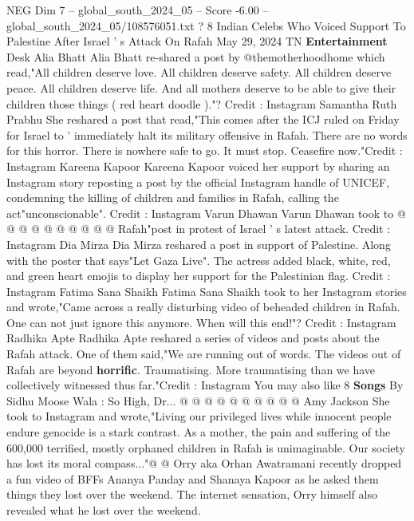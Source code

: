 \begin{textsample}{NEG Dim 7 – global\_south\_2024\_05 – Score -6.00 – global\_south\_2024\_05/108576051.txt}  \label{ex:f7_neg_384}
? 8 Indian Celebs Who Voiced Support To Palestine After Israel ' s Attack On Rafah May 29, 2024 TN \textbf{Entertainment} Desk Alia Bhatt Alia Bhatt re-shared a post by @themotherhoodhome which read,"All children deserve love.
All children deserve safety.
All children deserve peace.
All children deserve life.
And all mothers deserve to be able to give their children those things ( red heart doodle )."?
Credit : Instagram Samantha Ruth Prabhu She reshared a post that read,"This comes after the ICJ ruled on Friday for Israel to ' immediately halt its military offensive in Rafah.
There are no words for this horror.
There is nowhere safe to go.
It must stop.
Ceasefire now."Credit : Instagram Kareena Kapoor Kareena Kapoor voiced her support by sharing an Instagram story reposting a post by the official Instagram handle of UNICEF, condemning the killing of children and families in Rafah, calling the act"unconscionable".
Credit : Instagram Varun Dhawan Varun Dhawan took to @ @ @ @ @ @ @ @ @ @ Rafah"post in protest of Israel ' s latest attack.
Credit : Instagram Dia Mirza Dia Mirza reshared a post in support of Palestine.
Along with the poster that says"Let Gaza Live".
The actress added black, white, red, and green heart emojis to display her support for the Palestinian flag.
Credit : Instagram Fatima Sana Shaikh Fatima Sana Shaikh took to her Instagram stories and wrote,"Came across a really disturbing video of beheaded children in Rafah.
One can not just ignore this anymore.
When will this end!"?
Credit : Instagram Radhika Apte Radhika Apte reshared a series of videos and posts about the Rafah attack.
One of them said,"We are running out of words.
The videos out of Rafah are beyond \textbf{horrific}.
Traumatising.
More traumatising than we have collectively witnessed thus far."Credit : Instagram You may also like 8 \textbf{Songs} By Sidhu Moose Wala : So High, Dr... @ @ @ @ @ @ @ @ @ @ Amy Jackson She took to Instagram and wrote,"Living our privileged lives while innocent people endure genocide is a stark contrast.
As a mother, the pain and suffering of the 600,000 terrified, mostly orphaned children in Rafah is unimaginable.
Our society has lost its moral compass..."@ @ Orry aka Orhan Awatramani recently dropped a fun video of BFFs Ananya Panday and Shanaya Kapoor as he asked them things they lost over the weekend.
The internet sensation, Orry himself also revealed what he lost over the weekend.

\end{textsample}
